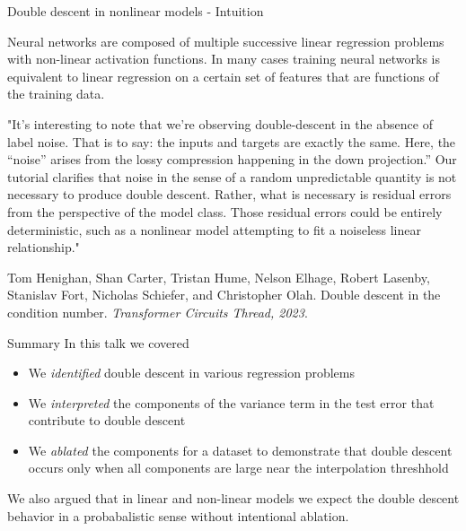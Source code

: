\documentclass{beamer}
\begin{document}
\begin{frame}{Double descent in nonlinear models - Intuition}

    Neural networks are composed of multiple successive linear regression problems with non-linear activation functions. In many cases training neural networks is equivalent to linear regression on a certain set of features that are functions of the training data. 

    \hspace{5cm}

    \pause
    
    \tiny
    
    "It's interesting to note that we're observing double-descent in the absence of label noise. That is to say: the inputs and targets are exactly the same. Here, the “noise” arises from the lossy compression happening in the down projection.” Our tutorial clarifies that noise in the sense of a random unpredictable quantity is not necessary to produce double descent. Rather, what is necessary is residual errors from the perspective of the model class. Those residual errors could be entirely deterministic, such as a nonlinear model attempting to fit a noiseless linear relationship."
    
    \hspace{5cm}

    Tom Henighan, Shan Carter, Tristan Hume, Nelson Elhage, Robert Lasenby, Stanislav Fort,
    Nicholas Schiefer, and Christopher Olah. Double descent in the condition number. \emph{Transformer
    Circuits Thread, 2023}.
\end{frame}


\begin{frame}{Summary}
    In this talk we covered
    \begin{itemize}
        \item We \emph{identified} double descent in various regression problems
        \item We \emph{interpreted} the components of the variance term in the test error that contribute to double descent
        \item We \emph{ablated} the components for a dataset to demonstrate that double descent occurs only when all components are large near the interpolation threshhold
    \end{itemize}

    \hspace{5cm}

    We also argued that in linear and non-linear models we expect the double descent behavior in a probabalistic sense without intentional ablation.

\end{frame}
\end{document}
